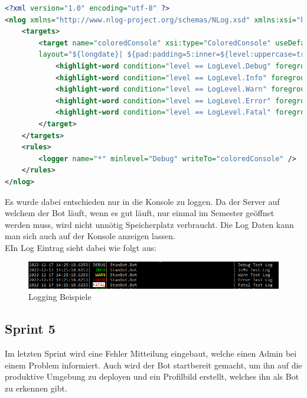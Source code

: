 \documentclass[a4paper, table]{article}
\begin{document}
\begin{lstlisting}[language=XML]
<?xml version="1.0" encoding="utf-8" ?>
<nlog xmlns="http://www.nlog-project.org/schemas/NLog.xsd" xmlns:xsi="http://www.w3.org/2001/XMLSchema-instance">
    <targets>
        <target name="coloredConsole" xsi:type="ColoredConsole" useDefaultRowHighlightingRules="false"
        layout="${longdate}| ${pad:padding=5:inner=${level:uppercase=true}}| ${pad:padding=-50:inner=${logger}}| ${message:withexception=true}" >
            <highlight-word condition="level == LogLevel.Debug" foregroundColor="Gray" text="DEBUG"/>
            <highlight-word condition="level == LogLevel.Info" foregroundColor="Green" text="INFO" />
            <highlight-word condition="level == LogLevel.Warn" foregroundColor="Yellow" text="WARN" />
            <highlight-word condition="level == LogLevel.Error" foregroundColor="Red" text="ERROR"/>
            <highlight-word condition="level == LogLevel.Fatal" foregroundColor="Red" text="FATAL" backgroundColor="White" />
        </target>
    </targets>
    <rules>
        <logger name="*" minlevel="Debug" writeTo="coloredConsole" />
    </rules>
</nlog>
\end{lstlisting}

Es wurde dabei entschieden nur in die Konsole zu loggen.
Da der Server auf welchem der Bot läuft, wenn es gut läuft, nur einmal im Semester geöffnet werden muss,
wird nicht unnötig Speicherplatz verbraucht.
Die Log Daten kann man sich auch auf der Konsole anzeigen lassen.\\
EIn Log Eintrag sieht dabei wie folgt aus:
\begin{figure}[h]
    \centering
    \includegraphics[width=1\textwidth]{img/LogLevels.png}
    \caption{Logging Beispiele}
    \label{fig:logging-examples}
\end{figure}

\newpage
\subsection{Sprint 5}
Im letzten Sprint wird eine Fehler Mitteilung eingebaut, welche einen Admin bei einem Problem informiert.
Auch wird der Bot startbereit gemacht, um ihn auf die produktive Umgebung zu deployen und ein Profilbild erstellt, 
welches ihn als Bot zu erkennen gibt.
\end{document}
